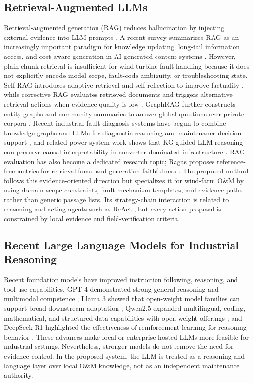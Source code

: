 \documentclass[lettersize,journal]{IEEEtran}
\begin{document}
\subsection{Retrieval-Augmented LLMs}
Retrieval-augmented generation (RAG) reduces hallucination by injecting external evidence into LLM prompts \cite{lewis2020rag}. A recent survey summarizes RAG as an increasingly important paradigm for knowledge updating, long-tail information access, and cost-aware generation in AI-generated content systems \cite{zhao2024ragSurvey}. However, plain chunk retrieval is insufficient for wind turbine fault handling because it does not explicitly encode model scope, fault-code ambiguity, or troubleshooting state. Self-RAG introduces adaptive retrieval and self-reflection to improve factuality \cite{asai2023selfrag}, while corrective RAG evaluates retrieved documents and triggers alternative retrieval actions when evidence quality is low \cite{yan2024crag}. GraphRAG further constructs entity graphs and community summaries to answer global questions over private corpora \cite{edge2024graphrag}. Recent industrial fault-diagnosis systems have begun to combine knowledge graphs and LLMs for diagnostic reasoning and maintenance decision support \cite{ma2026fdrkgllm}, and related power-system work shows that KG-guided LLM reasoning can preserve causal interpretability in converter-dominated infrastructure \cite{lan2025kgllmhvdc}. RAG evaluation has also become a dedicated research topic; Ragas proposes reference-free metrics for retrieval focus and generation faithfulness \cite{es2023ragas}. The proposed method follows this evidence-oriented direction but specializes it for wind-farm O\&M by using domain scope constraints, fault-mechanism templates, and evidence paths rather than generic passage lists. Its strategy-chain interaction is related to reasoning-and-acting agents such as ReAct \cite{yao2023react}, but every action proposal is constrained by local evidence and field-verification criteria.

\subsection{Recent Large Language Models for Industrial Reasoning}
Recent foundation models have improved instruction following, reasoning, and tool-use capabilities. GPT-4 demonstrated strong general reasoning and multimodal competence \cite{openai2023gpt4technical}; Llama 3 showed that open-weight model families can support broad downstream adaptation \cite{grattafiori2024llama3}; Qwen2.5 expanded multilingual, coding, mathematical, and structured-data capabilities with open-weight offerings \cite{qwen2024qwen25}; and DeepSeek-R1 highlighted the effectiveness of reinforcement learning for reasoning behavior \cite{deepseek2025r1}. These advances make local or enterprise-hosted LLMs more feasible for industrial settings. Nevertheless, stronger models do not remove the need for evidence control. In the proposed system, the LLM is treated as a reasoning and language layer over local O\&M knowledge, not as an independent maintenance authority.
\end{document}
